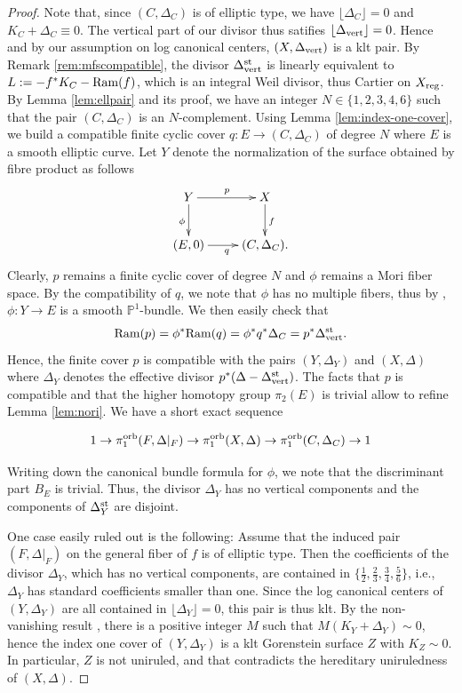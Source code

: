 \documentclass{amsart}
\newcommand{\pp}{\mathbb{P}}
\theoremstyle{definition}
\theoremstyle{remark}
\numberwithin{equation}{section}
\begin{document}
\begin{proof}
 Note that, since $(C,\Delta_C)$ is of elliptic type, we have $\lfloor \Delta_C\rfloor = 0$ and $K_C+\Delta_C\equiv 0$. The vertical part of our divisor thus satifies $\lfloor \Delta_{\rm vert}\rfloor = 0$. Hence and by our assumption on log canonical centers, $(X,\Delta_{\rm vert})$ is a klt pair. 
 By Remark \ref{rem:mfscompatible}, the divisor $\Delta_{\rm vert}^{\rm st}$ is linearly equivalent to $L:= -f^*K_C-{\rm Ram}(f)$, which is an integral Weil divisor, thus Cartier on $X_{\rm reg}$. 
By Lemma \ref{lem:ellpair} and its proof, we have an integer $N\in\{1,2,3,4,6\}$ such that the pair $(C,\Delta_C)$ is an $N$-complement. Using Lemma \ref{lem:index-one-cover}, we build a compatible finite cyclic cover $q:E\to (C,\Delta_C)$ of degree $N$ where $E$ is a smooth elliptic curve. Let $Y$ denote the normalization of the surface obtained by fibre product as follows
$$\xymatrix{
Y \ar[r]^{p} \ar[d]_{\phi} & X\ar[d]^{f} \\
(E,0) \ar[r]_{q} & (C,\Delta_C).
}$$
Clearly, $p$ remains a finite cyclic cover of degree $N$ and $\phi$ remains a Mori fiber space. By the compatibility of $q$, we note that $\phi$ has no multiple fibers, thus by \cite[Theorem II.2.8]{Kol96}, $\phi: Y\to E$ is a smooth $\pp^1$-bundle. We then easily check that 
$${\rm Ram}(p) =\phi^*{\rm Ram}(q)=\phi^*q^*\Delta_C=p^*\Delta_{\rm vert}^{\rm st}.$$
Hence, the finite cover $p$ is compatible with the pairs $(Y,\Delta_Y)$ and $(X,\Delta)$ where $\Delta_Y$ denotes the effective divisor $p^*(\Delta - \Delta_{\rm vert}^{\rm st})$.
The facts that $p$ is compatible and that the higher homotopy group $\pi_2(E)$ is trivial allow to refine Lemma \ref{lem:nori}. We have a short exact sequence

\begin{equation}\label{eq:specialnori}
    1\to \pi_1^{\rm orb}(F,\Delta|_F)\to \pi_1^{\rm orb}(X,\Delta)\to \pi_1^{\rm orb}(C,\Delta_C)\to 1
\end{equation}

\noindent Writing down the canonical bundle formula for $\phi$, we note that the discriminant part $B_E$ is trivial. Thus, the divisor $\Delta_Y$ has no vertical components and the components of $\Delta_Y^{\rm st}$ are disjoint.

\bigskip

One case easily ruled out is the following: Assume that the induced pair $(F,\Delta|_F)$ on the general fiber of $f$ is of elliptic type. Then the coefficients of the divisor $\Delta_Y$, which has no vertical components, are contained in $\{\frac{1}{2},\frac{2}{3},\frac{3}{4},\frac{5}{6}\}$, i.e., $\Delta_Y$ has standard coefficients smaller than one. Since the log canonical centers of $(Y,\Delta_Y)$ are all contained in $\lfloor\Delta_Y\rfloor = 0$, this pair is thus klt. By the non-vanishing result \cite[V.4.9 Corollary]{Nak04}, there is a positive integer $M$ such that $M(K_Y+\Delta_Y)\sim 0$, hence the index one cover of $(Y,\Delta_Y)$ is a klt Gorenstein surface $Z$ with $K_Z\sim 0$. In particular, $Z$ is not uniruled, and that contradicts the hereditary uniruledness of $(X,\Delta)$.


\end{proof}
\end{document}
